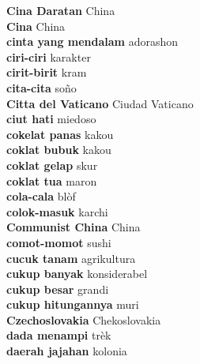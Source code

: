 \textbf{ Cina Daratan  } China \\
\textbf{ Cina  } China \\
\textbf{ cinta yang mendalam  } adorashon \\
\textbf{ ciri-ciri  } karakter \\
\textbf{ cirit-birit  } kram \\
\textbf{ cita-cita  } soño \\
\textbf{ Citta del Vaticano  } Ciudad Vaticano \\
\textbf{ ciut hati  } miedoso \\
\textbf{ cokelat panas  } kakou \\
\textbf{ coklat bubuk  } kakou \\
\textbf{ coklat gelap  } skur \\
\textbf{ coklat tua  } maron \\
\textbf{ cola-cala  } blòf \\
\textbf{ colok-masuk  } karchi \\
\textbf{ Communist China  } China \\
\textbf{ comot-momot  } sushi \\
\textbf{ cucuk tanam  } agrikultura \\
\textbf{ cukup banyak  } konsiderabel \\
\textbf{ cukup besar  } grandi \\
\textbf{ cukup hitungannya  } muri \\
\textbf{ Czechoslovakia  } Chekoslovakia \\
\textbf{ dada menampi  } trèk \\
\textbf{ daerah jajahan  } kolonia \\
